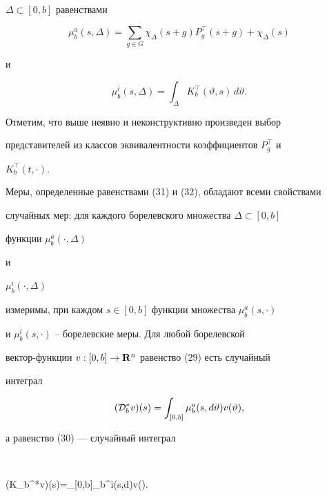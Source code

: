 $\Delta\subset[0,b]$ равенствами


%


\begin{equation}


\mu_b^a(s,\Delta)=\sum_{g\in G}\chi_\Delta(s+g)P_g^\top(s+g)+


\chi_\Delta(s)


\end{equation}


%


и


%


\begin{equation}


\mu_b^i(s,\Delta)=\int_\Delta K_b^\top (\vartheta,s)\,d\vartheta.


\end{equation}


%





Отметим, что выше неявно и неконструктивно произведен выбор


представителей из классов эквивалентности коэффициентов $P_g^\top$ и


$K_b^\top (t,\cdot)$.





Меры, определенные равенствами (31) и (32), обладают всеми свойствами


случайных мер: для каждого борелевского множества $\Delta\subset[0,b]$


функции $\mu_b^a(\cdot,\Delta)$


и


$\mu_b^i(\cdot,\Delta)$


измеримы, при каждом $s\in[0,b]$ функции множества $\mu_b^a(s,\cdot)$


и $\mu_b^i(s,\cdot)$ -- борелевские меры. Для любой борелевской


вектор-функции $v:[0,b]\to\bold R^n$ равенство (29) есть случайный


интеграл


$$


({\cal D}_b^*v)(s)=\int_{[0,b]}\mu_b^a(s,d\vartheta)v(\vartheta),


$$


а равенство (30) --- случайный интеграл


$$


({\cal K}_b^*v)(s)=\int_{[0,b]}\mu_b^i(s,d\vartheta)v(\vartheta).


